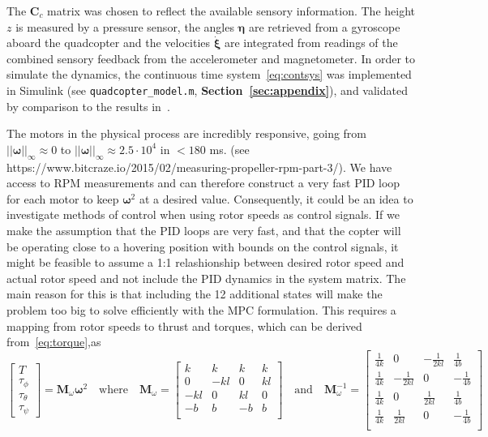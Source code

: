 \documentclass{article}
\begin{document}
The $\mathbf{C}_c$ matrix was chosen to reflect the available sensory information. The height $z$ is measured by a pressure sensor, the angles $\boldsymbol{\eta}$ are retrieved from a gyroscope aboard the quadcopter and the velocities $\dot{\boldsymbol{\xi}}$ are integrated from readings of the combined sensory feedback from the accelerometer and magnetometer. In order to simulate the dynamics, the continuous time system~\eqref{eq:contsys} was implemented in Simulink (see \texttt{quadcopter\_model.m}, \textbf{Section~\ref{sec:appendix}}), and validated by comparison to the results in~\cite{luukkonen2011modelling}.

The motors in the physical process are incredibly responsive, going from $||{\boldsymbol\omega}||_{\infty} \approx 0$ to $||{\boldsymbol\omega}||_{\infty} \approx 2.5\cdot 10^4$ in $< 180$ ms. (see https://www.bitcraze.io/2015/02/measuring-propeller-rpm-part-3/). We have access to RPM measurements and can therefore construct a very fast PID loop for each motor to keep $\boldsymbol\omega^2$ at a desired value. Consequently, it could be an idea to investigate methods of control when using rotor speeds as control signals. If we make the assumption that the PID loops are very fast, and that the copter will be operating close to a hovering position with bounds on the control signals, it might be feasible to assume a 1:1 relashionship between desired rotor speed and actual rotor speed and not include the PID dynamics in the system matrix. The main reason for this is that including the 12 additional states will make the problem too big to solve efficiently with the MPC formulation. This requires a mapping from rotor speeds to thrust and torques, which can be derived from~\eqref{eq:torque},as
\begin{equation}
\begin{bmatrix}
T\\
\tau_{\phi}\\
\tau_{\theta}\\
\tau_{\psi}
\end{bmatrix}
=
\mathbf{M}_{\omega}\boldsymbol\omega^2
\quad\text{where}\quad
\mathbf{M}_{\omega} = 
\begin{bmatrix}
    k&    k&   k&   k\\
    0& -kl&   0& kl\\
 -kl&    0& kl&  0\\
   -b&    b&  -b&   b\\
\end{bmatrix}
\quad\text{and}\quad
\mathbf{M}^{-1}_{\omega} = 
\begin{bmatrix}
    \frac{1}{4k}& 0 & -\frac{1}{2kl} &  \frac{1}{4b}\\
    \frac{1}{4k}& -\frac{1}{2kl} & 0 & -\frac{1}{4b}\\
    \frac{1}{4k}& 0 &  \frac{1}{2kl} &  \frac{1}{4b}\\
    \frac{1}{4k}&  \frac{1}{2kl} & 0 & -\frac{1}{4b}\\
\end{bmatrix}
\end{equation}
\end{document}
